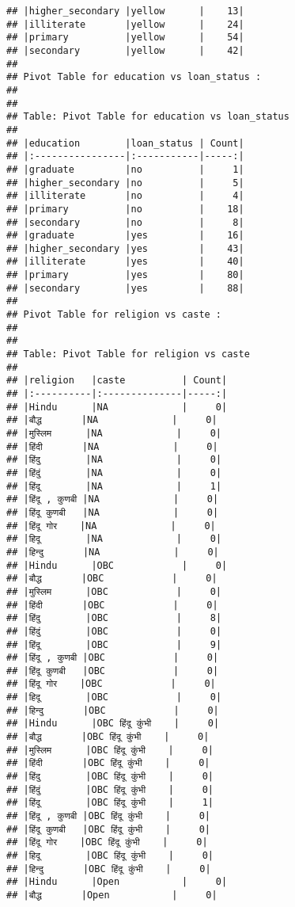 \documentclass[
]{article}
\begin{document}
\begin{verbatim}
## |higher_secondary |yellow      |    13|
## |illiterate       |yellow      |    24|
## |primary          |yellow      |    54|
## |secondary        |yellow      |    42|
## 
## Pivot Table for education vs loan_status :
## 
## 
## Table: Pivot Table for education vs loan_status
## 
## |education        |loan_status | Count|
## |:----------------|:-----------|-----:|
## |graduate         |no          |     1|
## |higher_secondary |no          |     5|
## |illiterate       |no          |     4|
## |primary          |no          |    18|
## |secondary        |no          |     8|
## |graduate         |yes         |    16|
## |higher_secondary |yes         |    43|
## |illiterate       |yes         |    40|
## |primary          |yes         |    80|
## |secondary        |yes         |    88|
## 
## Pivot Table for religion vs caste :
## 
## 
## Table: Pivot Table for religion vs caste
## 
## |religion   |caste          | Count|
## |:----------|:--------------|-----:|
## |Hindu      |NA             |     0|
## |बौद्ध       |NA             |     0|
## |मुस्लिम      |NA             |     0|
## |हिंदी       |NA             |     0|
## |हिंदु        |NA             |     0|
## |हिंदुं        |NA             |     0|
## |हिंदू        |NA             |     1|
## |हिंदू , कुणबी |NA             |     0|
## |हिंदू कुणबी   |NA             |     0|
## |हिंदू गोर    |NA             |     0|
## |हिदू        |NA             |     0|
## |हिन्दु       |NA             |     0|
## |Hindu      |OBC            |     0|
## |बौद्ध       |OBC            |     0|
## |मुस्लिम      |OBC            |     0|
## |हिंदी       |OBC            |     0|
## |हिंदु        |OBC            |     8|
## |हिंदुं        |OBC            |     0|
## |हिंदू        |OBC            |     9|
## |हिंदू , कुणबी |OBC            |     0|
## |हिंदू कुणबी   |OBC            |     0|
## |हिंदू गोर    |OBC            |     0|
## |हिदू        |OBC            |     0|
## |हिन्दु       |OBC            |     0|
## |Hindu      |OBC हिंदू कुंभी    |     0|
## |बौद्ध       |OBC हिंदू कुंभी    |     0|
## |मुस्लिम      |OBC हिंदू कुंभी    |     0|
## |हिंदी       |OBC हिंदू कुंभी    |     0|
## |हिंदु        |OBC हिंदू कुंभी    |     0|
## |हिंदुं        |OBC हिंदू कुंभी    |     0|
## |हिंदू        |OBC हिंदू कुंभी    |     1|
## |हिंदू , कुणबी |OBC हिंदू कुंभी    |     0|
## |हिंदू कुणबी   |OBC हिंदू कुंभी    |     0|
## |हिंदू गोर    |OBC हिंदू कुंभी    |     0|
## |हिदू        |OBC हिंदू कुंभी    |     0|
## |हिन्दु       |OBC हिंदू कुंभी    |     0|
## |Hindu      |Open           |     0|
## |बौद्ध       |Open           |     0|

\end{verbatim}
\end{document}
